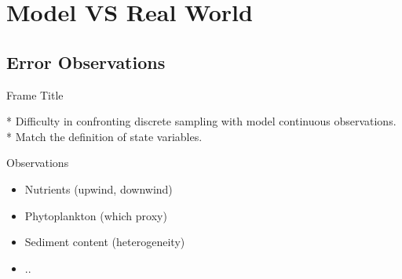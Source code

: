 \documentclass[final,xcolor=dvipsnames]{beamer}
\begin{document}
\section{Model VS Real World}


\subsection{Error Observations}
\begin{frame}{Frame Title}
    

* Difficulty in confronting discrete sampling with model continuous observations. 
* Match the definition of state variables.

\begin{exampleblock}{Observations}
\begin{itemize}
    \item Nutrients (upwind, downwind)
    \item Phytoplankton (which proxy)
    \item Sediment content (heterogeneity)
    \item .. 
\end{itemize} 
\end{exampleblock}
\end{frame}
\end{document}
